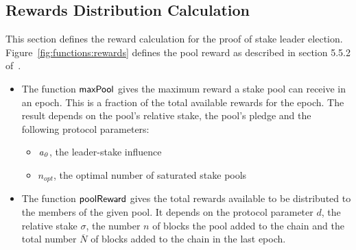 \clearpage

\subsection{Rewards Distribution Calculation}
\label{sec:reward-dist}

This section defines the reward calculation for the proof of stake leader election.
Figure~\ref{fig:functions:rewards} defines the pool reward as described in section
5.5.2 of~\cite{delegation_design}.

\begin{itemize}
  \item The function $\mathsf{maxPool}$ gives the maximum reward a stake pool can receive in an epoch.
    This is a fraction of the total available rewards for the epoch.
    The result depends on the pool's relative stake, the pool's pledge and the following
    protocol parameters:
    \begin{itemize}
      \item $\mathit{a_0}$, the leader-stake influence
      \item $n_{opt}$, the optimal number of saturated stake pools
    \end{itemize}
  \item The function $\mathsf{poolReward}$ gives the total rewards available to be
    distributed to the members of the given pool. It depends on the protocol parameter $d$,
    the relative stake $\sigma$, the number $n$ of blocks the pool added to the chain and the
    total number $\overline{N}$ of blocks added to the chain in the last epoch.

\end{itemize}

